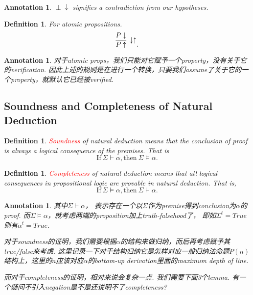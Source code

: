 \documentclass{article}
\theoremstyle{plain}
\newtheorem{definition}[theorem]{Definition}
\newtheorem{annotation}[theorem]{Annotation}
\theoremstyle{nonumberplain}
\newcommand{\redt}[1]{\textcolor{red}{#1}}
\begin{document}
\begin{annotation}
\rm $\perp \downarrow$ signifies a contradiction from our hypotheses.
\end{annotation}

\begin{definition}
\rm For atomic propositions.
$$
\infer[\downarrow\uparrow]{P \uparrow}{P \downarrow}.
$$
\end{definition}

\begin{annotation}
\rm 对于atomic props，我们只能对它赋予一个property，没有关于它的verification. 因此上述的规则是在进行一个转换，只要我们assume了关于它的一个property，就默认它已经被verified. 
\end{annotation}

\newpage
\subsection{Soundness and Completeness of Natural Deduction}

\begin{definition}
\rm \cite{cs245-nd}\redt{Soundness} of natural deduction means that the conclusion of proof is always a logical consequence of the premises. That is
$$
\text{If}~\Sigma \vdash \alpha, \text{then}~\Sigma \vDash \alpha. 
$$ 
\end{definition}


\begin{definition}
\rm \redt{Completeness} of natural deduction means that all logical consequences in propositional logic are provable in natural deduction. That is,
$$
\text{If}~\Sigma \vDash \alpha, \text{then}~\Sigma \vdash \alpha.
$$ 
\end{definition}

\begin{annotation}
\rm 其中$\Sigma \vdash \alpha$， 表示存在一个以$\Sigma$作为premise得到conclusion为$\alpha$的proof. 而$\Sigma \vDash \alpha$，就考虑两端的proposition加上truth-falsehood了， 即如$\Sigma^t = True$则有$\alpha^t = True$.

对于soundness的证明，我们需要根据$\alpha$的结构来做归纳，而后再考虑赋予其true/false来考虑. 这里记录一下对于结构归纳它是怎样对应一般归纳法命题$P(n)$结构上，这里的$n$应该对应$\alpha$的bottom-up derivation里面的maximum depth of line. 

而对于completeness的证明，相对来说会复杂一点. 我们需要下面3个lemma. 有一个疑问不引入negation是不是还说明不了completeness?
\end{annotation}
\end{document}
